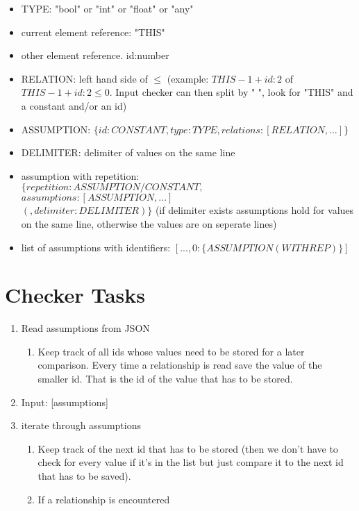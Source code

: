 \documentclass[11pt]{article}
\begin{document}
\begin{itemize}
  \item TYPE: "bool" or "int" or "float" or "any"
  \item current element reference: "THIS"
  \item other element reference. id:number
  \item RELATION: left hand side of $\leq$ (example: $THIS - 1 + id{:}2$ of $THIS - 1 + id{:}2 \leq 0$. Input checker can then split by " ", look for "THIS" and a constant and/or an id)
  \item ASSUMPTION: $\{id: CONSTANT, type: TYPE, relations: [RELATION, ...]\}$
  \item DELIMITER: delimiter of values on the same line
  \item assumption with repetition:\\
  $\{repetition:ASSUMPTION/CONSTANT,$\\
  $assumptions:[ASSUMPTION, ...]$\\
  $(, delimiter:DELIMITER)\}$ (if delimiter exists assumptions hold for values on the same line, otherwise the values are on seperate lines)
  \item list of assumptions with identifiers: $[..., 0{:}\{ASSUMPTION(WITHREP)\}]$
\end{itemize}

\section{Checker Tasks}

\begin{enumerate}
  \item Read assumptions from JSON
  \begin{enumerate}
    \item Keep track of all ids whose values need to be stored for a later comparison. Every time a relationship is read save the value of the smaller id. That is the id of the value that has to be stored.
  \end{enumerate}
  \item Input: [assumptions]
  \item iterate through assumptions
  \begin{enumerate}
    \item Keep track of the next id that has to be stored (then we don't have to check for every value if it's in the list but just compare it to the next id that has to be saved).
    \item If a relationship is encountered 
  \end{enumerate}
\end{enumerate}
\end{document}
